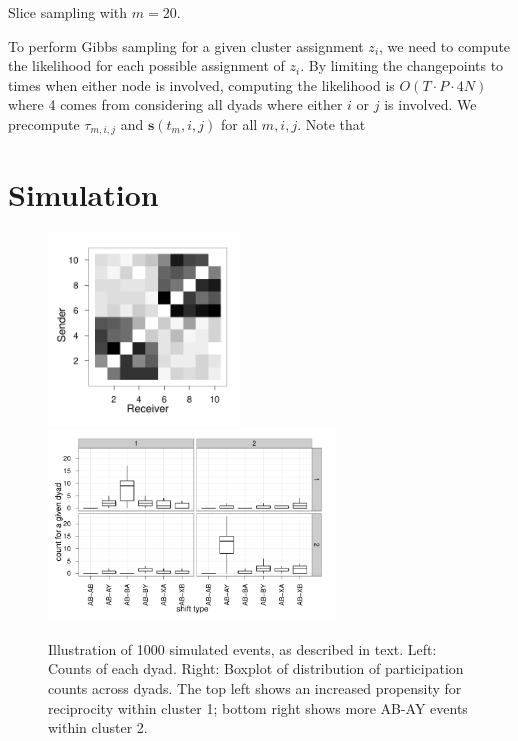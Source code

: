 \documentclass[11pt]{article}
\begin{document}

Slice sampling with $m=20$.

 To perform Gibbs sampling for a given cluster assignment $z_i$, we need to compute the likelihood for each possible assignment of $z_i$.   By limiting the changepoints to times when either node is involved, computing the likelihood is $O(T \cdot P \cdot 4N)$ where 4 comes from considering all dyads where either $i$ or $j$ is involved.  We precompute $\tau_{m,i,j}$ and $\mathbf{s}(t_m,i,j)$ for all $m,i,j$.  Note that 




\section{Simulation}
\begin{figure}
\center
\includegraphics[width=2in]{../figs/syn/mat.pdf}
\includegraphics[width=3in]{../figs/syn/counts.pdf}
\caption{Illustration of 1000 simulated events, as described in text. Left: Counts of each dyad. Right: Boxplot of distribution of participation counts across dyads.  The top left shows an increased propensity for reciprocity within cluster 1; bottom right shows more AB-AY events within cluster 2.}
\label{fig:syncounts}
\end{figure}
\end{document}
